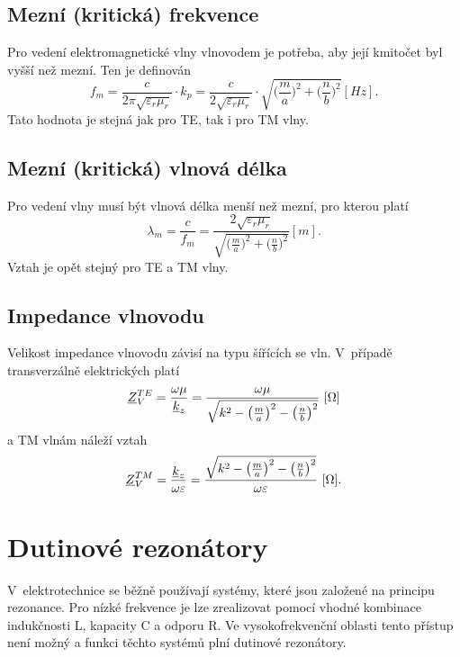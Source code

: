 \subsection*{Mezní (kritická) frekvence}
Pro vedení elektromagnetické vlny vlnovodem je potřeba, aby její kmitočet byl vyšší než mezní. Ten je definován
\begin{equation}
f_{m} = \frac{c}{2\pi\sqrt{\varepsilon_{r}\mu_{r}}}\cdot k_p = \frac{c}{2\sqrt{\varepsilon_{r}\mu_{r}}}\cdot \sqrt{\bigg(\frac{m}{a}\bigg)^{2} + \bigg(\frac{n}{b}\bigg)^{2}}\unit{[Hz]}. 
	\label{rce:evlny_vlnovody_mezni_frekvence}
\end{equation}
Tato hodnota je stejná jak pro TE, tak i pro TM vlny.
\subsection*{Mezní (kritická) vlnová délka}
Pro vedení vlny musí být vlnová délka menší než mezní, pro kterou platí
\begin{equation}
\lambda_{m} = \frac{c}{f_{m}} = \frac{2\sqrt{\varepsilon_{r}\mu_{r}}}{\sqrt{\big(\frac{m}{a}\big)^{2} + \big(\frac{n}{b}\big)^{2}}}\unit{[m]}. 
	\label{rce:evlny_vlnovody_mezni_vlnova_delka}
\end{equation}
Vztah je opět stejný pro TE a TM vlny.
\subsection*{Impedance vlnovodu}
Velikost impedance vlnovodu závisí na typu šířících se vln. V~případě transverzálně elektrických platí
\begin{displaymath}
	{\underline{Z}}_{V}^{TE} = \frac{\omega\mu}{{\underline{k}}_z} = \frac{\omega\mu}{\sqrt{k^{2} - \big(\frac{m}{a}\big)^{2} - \big(\frac{n}{b}\big)^{2}}}\mathrm{\ [\Omega]}		
\end{displaymath}
a TM vlnám náleží vztah
\begin{displaymath}
	{\underline{Z}}_{V}^{TM} = \frac{{\underline{k}}_z}{\omega\varepsilon} = \frac{\sqrt{k^{2} - \big(\frac{m}{a}\big)^{2} - \big(\frac{n}{b}\big)^{2}}}{\omega\varepsilon}\mathrm{\ [\Omega]}.
\end{displaymath}

\section{Dutinové rezonátory}
V~elektrotechnice se běžně používají systémy, které jsou založené na principu rezonance. Pro nízké frekvence je lze zrealizovat pomocí vhodné kombinace indukčnosti L, kapacity C a odporu R. Ve vysokofrekvenční oblasti tento přístup není možný a funkci těchto systémů plní dutinové rezonátory. 

